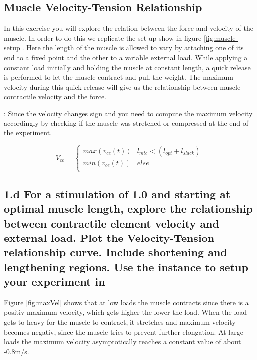\documentclass{cmc}
\begin{document}
\subsection*{Muscle Velocity-Tension Relationship}
In this exercise you will explore the relation between the force and
velocity of the muscle. In order to do this we replicate the set-up
show in figure \ref{fig:muscle-setup}. Here the length of the muscle
is allowed to vary by attaching one of its end to a fixed point and
the other to a variable external load. While applying a constant load
initially and holding the muscle at constant length, a quick release
is performed to let the muscle contract and pull the weight. The
maximum velocity during this quick release will give us the
relationship between muscle contractile velocity and the force.


 : Since the velocity changes sign and you need to compute the maximum
velocity accordingly by checking if the muscle was stretched or compressed
at the end of the experiment.

\begin{equation}
  \label{eq:2}
 V_{ce} = \left\{
\begin{array}{ll}
      max(v_{ce}(t)) & l_{mtc} < (l_{opt} + l_{slack}) \\
      min(v_{ce}(t)) & else \\
\end{array}
\right.
\end{equation}

\subsection*{1.d For a stimulation of 1.0 and starting at optimal
  muscle length, explore the relationship between contractile element
  velocity and external load. Plot the Velocity-Tension relationship
  curve. Include shortening and lengthening regions. Use the
   instance
  to setup your experiment in }
  
Figure \ref{fig:maxVel} shows that at low loads the muscle contracts since there is a positiv maximum velocity, which gets higher the lower the load. When the load gets to heavy for the muscle to contract, it stretches and maximum velocity becomes negativ, since the muscle tries to prevent further elongation. At large loads the maximum velocity asymptotically reaches a constant value of about -0.8m/s.
\end{document}
